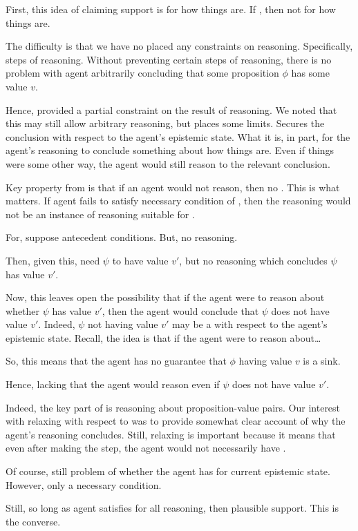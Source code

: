 \begin{note}
  First, this idea of claiming support is for how things are.
  If \epVW{}, then not for how things are.

  The difficulty is that we have no placed any constraints on reasoning.
  Specifically, steps of reasoning.
  Without preventing certain steps of reasoning, there is no problem with agent arbitrarily concluding that some proposition \(\phi\) has some value \(v\).

  Hence, \ideaS{} provided a partial constraint on the result of reasoning.
  We noted that this may still allow arbitrary reasoning, but \ideaS{} places some limits.
  Secures the conclusion with respect to the agent's epistemic state.
  What it is, in part, for the agent's reasoning to conclude something about how things are.
  Even if things were some other way, the agent would still reason to the relevant conclusion.
\end{note}

\begin{note}
  Key property from \ideaS{} is that if an agent would not reason, then no \support{}.
  This is what matters.
  If agent fails to satisfy necessary condition of \ideaCS{}, then the reasoning would not be an instance of reasoning suitable for \support{}.

  For, suppose antecedent conditions.
  But, no reasoning.

  Then, given this, need \(\psi\) to have value \(v'\), but no reasoning which concludes \(\psi\) has value \(v'\).

  Now, this leaves open the possibility that if the agent were to reason about whether \(\psi\) has value \(v'\), then the agent would conclude that \(\psi\) does not have value \(v'\).
  Indeed, \(\psi\) not having value \(v'\) may be a \sink{} with respect to the agent's epistemic state.
  Recall, the idea is that if the agent were to reason about\dots

  So, this means that the agent has no guarantee that \(\phi\) having value \(v\) is a sink.

  Hence, lacking that the agent would reason even if \(\psi\) does not have value \(v'\).

  Indeed, the key part of \ideaS{} is reasoning about \epVAd{} proposition-value pairs.
  Our interest with relaxing with respect to \ideaS{} was to provide somewhat clear account of why the agent's reasoning concludes.
  Still, relaxing is important because it means that even after making the step, the agent would not necessarily have \support{}.

  Of course, still problem of whether the agent has \support{} for current epistemic state.
  However, only a necessary condition.

  Still, so long as agent satisfies \ideaCS{} for all reasoning, then plausible support.
  This is the converse.
\end{note}

